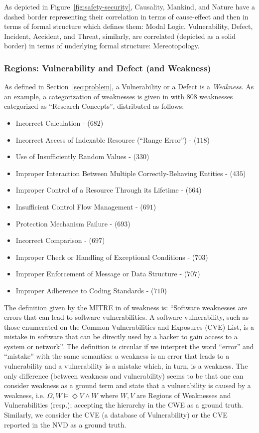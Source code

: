 \documentclass{article}
\theoremstyle{definition}
\theoremstyle{corollary}
\theoremstyle{lemma}
\theoremstyle{theorem}
\theoremstyle{theorem}
\newcommand{\World}{\Omega}
\newcommand{\Weakness}{W}
\newcommand{\Vulnerability}{V}
\begin{document}
As depicted in Figure~\ref{fig:safety-security}, Causality, Mankind, and Nature
have a dashed border representing their correlation in terms of cause-effect
and then in terms of formal structure which defines them: Modal Logic.
Vulnerability, Defect, Incident, Accident, and Threat, similarly, 
are correlated (depicted as a solid border) in terms of underlying 
formal structure: Mereotopology.

\subsubsection{Regions: Vulnerability and Defect (and Weakness)}\label{sec:vulnerabilitydefect}
As defined in Section~\ref{sec:problem}, a Vulnerability or a Defect is a
\emph{Weakness}.  As an example, a categorization of weaknesses is given
in\autocite{MITRE2020CWEresearch} with 808 weaknesses categorized as ``Research
Concepts'', distributed as follows:
\begin{itemize}[noitemsep]
	\item Incorrect Calculation - ($682$)
	\item Incorrect Access of Indexable Resource (``Range Error'') - ($118$)
	\item Use of Insufficiently Random Values - ($330$)
	\item Improper Interaction Between Multiple Correctly-Behaving Entities - ($435$)
	\item Improper Control of a Resource Through its Lifetime - ($664$)
	\item Insufficient Control Flow Management - ($691$)
	\item Protection Mechanism Failure - ($693$)
	\item Incorrect Comparison - ($697$)
	\item Improper Check or Handling of Exceptional Conditions - ($703$)
	\item Improper Enforcement of Message or Data Structure - ($707$)
	\item Improper Adherence to Coding Standards - ($710$)
\end{itemize}

The definition given by the MITRE in\autocite{MITRE2020CWEweakness} of
weakness is: ``Software weaknesses are errors that can lead to software
vulnerabilities. A software vulnerability, such as those enumerated on the
Common Vulnerabilities and Exposures (CVE) List, is a mistake in software that
can be directly used by a hacker to gain access to a system or network''.
The definition is circular if we interpret the word ``error'' and
``mistake'' with the same semantics: a weakness is an error that leads to a
vulnerability and a vulnerability is a mistake which, in turn, is a weakness.
The only difference (between weakness and vulnerability) seems to be
that one can consider weakness as a ground term and state that a
vulnerability is caused by a weakness, i.e. 
$\World,\Weakness\models\Diamond\Vulnerability\wedge\Weakness$ where
$\Weakness,\Vulnerability$ are Regions of Weaknesses and Vulnerabilities (resp.);
accepting the hierarchy in the CWE\autocite{CWE} as a ground truth. 
Similarly, we consider the CVE\autocite{CVE} (a database of Vulnerability) 
or the CVE reported in the NVD as a ground truth. 
\end{document}

